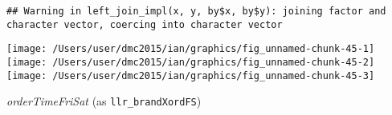 \documentclass[10pt]{report}
\newenvironment{Shaded}{}{}
\newcommand{\KeywordTok}[1]{\textcolor[rgb]{0.00,0.44,0.13}{\textbf{{#1}}}}
\newcommand{\DataTypeTok}[1]{\textcolor[rgb]{0.56,0.13,0.00}{{#1}}}
\newcommand{\StringTok}[1]{\textcolor[rgb]{0.25,0.44,0.63}{{#1}}}
\newcommand{\NormalTok}[1]{{#1}}
\begin{document}
\begin{Shaded}
\end{Shaded}

\begin{verbatim}
## Warning in left_join_impl(x, y, by$x, by$y): joining factor and character vector, coercing into character vector
\end{verbatim}

\begin{Shaded}
\end{Shaded}

\begin{center}\texttt{[image: /Users/user/dmc2015/ian/graphics/fig\_unnamed-chunk-45-1]} \texttt{[image: /Users/user/dmc2015/ian/graphics/fig\_unnamed-chunk-45-2]} \texttt{[image: /Users/user/dmc2015/ian/graphics/fig\_unnamed-chunk-45-3]} \end{center}

\emph{orderTimeFriSat} (as \texttt{llr\_brandXordFS})
\end{document}
